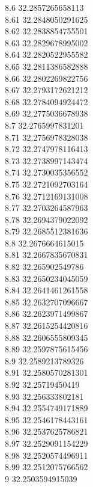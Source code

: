 {8.6	32.2857265658113\\
8.61	32.2848050291625\\
8.62	32.2838854755501\\
8.63	32.2829678995002\\
8.64	32.2820522955582\\
8.65	32.2811386582888\\
8.66	32.2802269822756\\
8.67	32.2793172621212\\
8.68	32.2784094924472\\
8.69	32.2775036678938\\
8.7	32.2765997831201\\
8.71	32.2756978328038\\
8.72	32.2747978116413\\
8.73	32.2738997143474\\
8.74	32.2730035356552\\
8.75	32.2721092703164\\
8.76	32.2712169131008\\
8.77	32.2703264587963\\
8.78	32.2694379022092\\
8.79	32.2685512381636\\
8.8	32.2676664615015\\
8.81	32.2667835670831\\
8.82	32.265902549786\\
8.83	32.2650234045059\\
8.84	32.2641461261558\\
8.85	32.2632707096667\\
8.86	32.2623971499867\\
8.87	32.2615254420816\\
8.88	32.2606555809345\\
8.89	32.2597875615456\\
8.9	32.2589213789326\\
8.91	32.2580570281301\\
8.92	32.25719450419\\
8.93	32.256333802181\\
8.94	32.2554749171889\\
8.95	32.2546178443161\\
8.96	32.2537625786821\\
8.97	32.2529091154229\\
8.98	32.2520574496911\\
8.99	32.2512075766562\\
9	32.2503594915039\\
}
